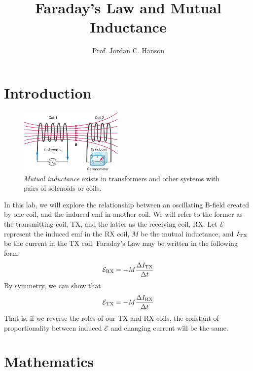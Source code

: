 \documentclass[12pt,twocolumn]{article}
\title{Faraday's Law and Mutual Inductance}
\author{Prof. Jordan C. Hanson}
\begin{document}
\small
\maketitle

\section{Introduction}

\begin{figure}[ht]
\centering
\includegraphics[width=0.45\textwidth]{mutual.png}
\caption{\label{fig:mutual} \textit{Mutual inductance} exists in transformers and other systems with pairs of solenoids or coils.}
\end{figure}

\noindent
In this lab, we will explore the relationship between an oscillating B-field created by one coil, and the induced emf in another coil.  We will refer to the former as the transmitting coil, TX, and the latter as the receiving coil, RX.  Let $\mathcal{E}$ represent the induced emf in the RX coil, $M$ be the mutual inductance, and $I_{\rm TX}$ be the current in the TX coil.  Faraday's Law may be written in the following form:
\begin{equation}
\mathcal{E}_{\rm RX} = - M \frac{\Delta I_{\rm TX}}{\Delta t}
\end{equation}
By symmetry, we can show that
\begin{equation}
\mathcal{E}_{\rm TX} = - M \frac{\Delta I_{\rm RX}}{\Delta t}
\end{equation}
That is, if we reverse the roles of our TX and RX coils, the constant of proportionality between induced $\mathcal{E}$ and changing current will be the same.

\section{Mathematics}
\end{document}

